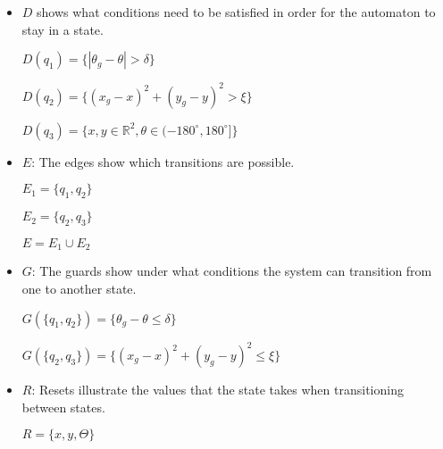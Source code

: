 \begin{itemize}
\item
  $D$ shows what conditions need to be satisfied in order for the automaton to
  stay in a state.

  $D(q_1)=\{|\theta_g-\theta|>\delta\}$

  $D(q_2)=\{(x_g-x)^2+(y_g-y)^2>\xi\}$

  $D(q_3)= \{x,y \in \mathbb{R}^2, \theta \in(-180^{\circ}, 180^{\circ}] \}$

\item
  $E$: The edges show which transitions are possible.

  $E_1 = \{ q_1,q_2\}$

  $E_2 = \{ q_2,q_3\}$

  $E = E_1 \cup E_2$

\item
  $G$: The guards show under what conditions the system can transition from one to
  another state.

  $G(\{q_1,q_2\})=\{\theta_g-\theta\le \delta \}$

  $G(\{q_2,q_3\})=\{(x_g-x)^2+(y_g-y)^2 \leq \xi\}$

\item
  $R$: Resets illustrate the values that the state takes when transitioning
  between states.

  $R=\{x,y,\Theta\}$

\end{itemize}
